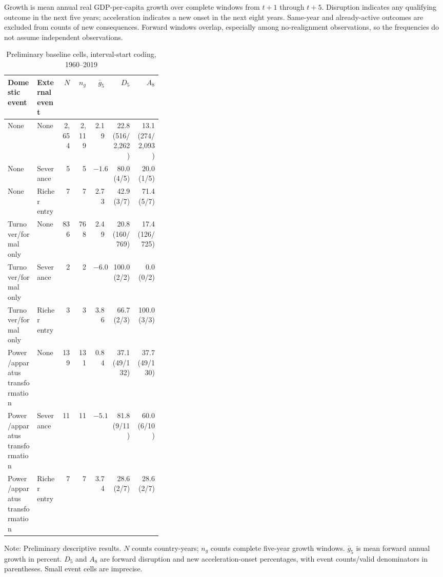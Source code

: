 \documentclass[11pt]{article}
\begin{document}
Growth is mean annual real GDP-per-capita growth over complete windows from $t+1$ through $t+5$. Disruption indicates any qualifying outcome in the next five years; acceleration indicates a new onset in the next eight years. Same-year and already-active outcomes are excluded from counts of new consequences. Forward windows overlap, especially among no-realignment observations, so the frequencies do not assume independent observations.

\begin{table}[htbp]
\centering
\begin{threeparttable}
\caption{Preliminary baseline cells, interval-start coding, 1960--2019}
\label{tab:cells}
\scriptsize
\begin{tabular}{@{}p{0.19\linewidth}p{0.16\linewidth}rrrrr@{}}
\toprule
Domestic event & External event & $N$ & $n_g$ & $\bar g_{5}$ & $D_5$ & $A_8$ \\
\midrule
None & None & 2,654 & 2,119 & 2.19 & 22.8 (516/2,262) & 13.1 (274/2,093) \\
None & Severance & 5 & 5 & $-1.67$ & 80.0 (4/5) & 20.0 (1/5) \\
None & Richer entry & 7 & 7 & 2.73 & 42.9 (3/7) & 71.4 (5/7) \\
Turnover/formal only & None & 836 & 768 & 2.49 & 20.8 (160/769) & 17.4 (126/725) \\
Turnover/formal only & Severance & 2 & 2 & $-6.03$ & 100.0 (2/2) & 0.0 (0/2) \\
Turnover/formal only & Richer entry & 3 & 3 & 3.86 & 66.7 (2/3) & 100.0 (3/3) \\
Power/apparatus transformation & None & 139 & 131 & 0.84 & 37.1 (49/132) & 37.7 (49/130) \\
Power/apparatus transformation & Severance & 11 & 11 & $-5.10$ & 81.8 (9/11) & 60.0 (6/10) \\
Power/apparatus transformation & Richer entry & 7 & 7 & 3.74 & 28.6 (2/7) & 28.6 (2/7) \\
\bottomrule
\end{tabular}
\begin{tablenotes}
\scriptsize
\item Note: Preliminary descriptive results. $N$ counts country-years; $n_g$ counts complete five-year growth windows. $\bar g_5$ is mean forward annual growth in percent. $D_5$ and $A_8$ are forward disruption and new acceleration-onset percentages, with event counts/valid denominators in parentheses. Small event cells are imprecise.
\end{tablenotes}
\end{threeparttable}
\end{table}
\end{document}
